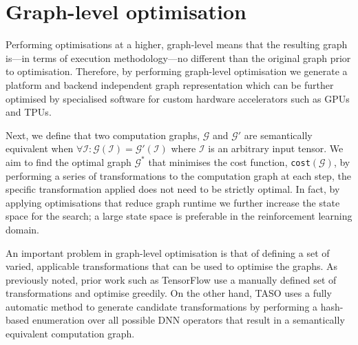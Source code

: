 \section{Graph-level optimisation}

Performing optimisations at a higher, graph-level means that the resulting graph is---in terms of execution methodology---no different than the original graph prior to optimisation. Therefore, by performing graph-level optimisation we generate a platform and backend independent graph representation which can be further optimised by specialised software for custom hardware accelerators such as GPUs and TPUs.

Next, we define that two computation graphs, $\mathcal{G}$ and $\mathcal{G}'$ are semantically equivalent when $\forall \mathcal{I} : \mathcal{G}(\mathcal{I}) = \mathcal{G}'(\mathcal{I})$ where $\mathcal{I}$ is an arbitrary input tensor. We aim to find the optimal graph $\mathcal{G}^*$ that minimises the cost function, \texttt{cost}$(\mathcal{G})$, by performing a series of transformations to the computation graph at each step, the specific transformation applied does not need to be strictly optimal. In fact, by applying optimisations that reduce graph runtime we further increase the state space for the search; a large state space is preferable in the reinforcement learning domain.

An important problem in graph-level optimisation is that of defining a set of varied, applicable transformations that can be used to optimise the graphs. As previously noted, prior work such as TensorFlow use a manually defined set of transformations and optimise greedily. On the other hand, TASO uses a fully automatic method to generate candidate transformations by performing a hash-based enumeration over all possible DNN operators that result in a semantically equivalent computation graph.

